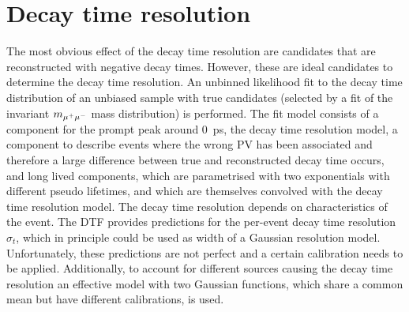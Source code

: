 \section{Decay time resolution}
\label{sec:bd2jpsiks:decaytime:resolution}

The most obvious effect of the decay time resolution are candidates that are
reconstructed with negative decay times. However, these are ideal candidates
to determine the decay time resolution. An unbinned likelihood fit to the
decay time distribution of an unbiased \BdToJPsiKS sample with true \jpsi
candidates (selected by a fit of the invariant $m_{{\mu^+\mu^-}}$ mass distribution)
is performed. The fit model consists of a component for the prompt peak around
\SI{0}{\ps}, \ie the decay time resolution model, a component to describe
events where the wrong PV has been associated and therefore a large difference
between true and reconstructed decay time occurs, and long lived components,
which are parametrised with two exponentials with different pseudo lifetimes,
and which are themselves convolved with the decay time resolution model. The
decay time resolution depends on characteristics of the event. The DTF
provides predictions for the per-event decay time resolution $\sigma_t$, which
in principle could be used as width of a Gaussian resolution model.
Unfortunately, these predictions are not perfect and a certain calibration
needs to be applied. Additionally, to account for different sources causing
the decay time resolution an effective model with two Gaussian functions, which
share a common mean but have different calibrations, is used.

